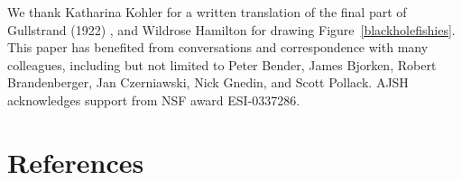 \documentclass[twocolumn,showpacs,preprintnumbers,amsmath,amssymb,prb]{revtex4}
\begin{document}


\begin{acknowledgements}
We thank Katharina Kohler for a written translation
of the final part of Gullstrand (1922) \cite{Gullstrand},
and
Wildrose Hamilton for drawing Figure~\ref{blackholefishies}.
This paper has benefited from conversations and correspondence
with many colleagues,
including but not limited to
Peter Bender, James Bjorken, Robert Brandenberger, Jan Czerniawski,
Nick Gnedin, and Scott Pollack.
AJSH acknowledges support from NSF award ESI-0337286.
\end{acknowledgements}

\section*{References}
\end{document}
